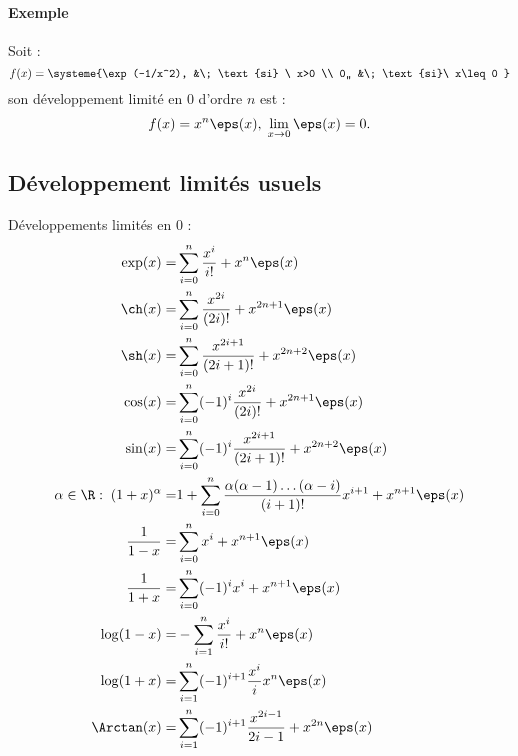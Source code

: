 \documentclass{mybourbaki}
\begin{document}
\paragraph{Exemple}Soit : \[ f(x) = \systeme{\exp(-1/x^2), &\; \text{si} \ x>0 \\ 0,, &\; \text{si}\ x\leq 0 }\]son développement limité en $0$ d'ordre $n$ est : \[ f(x) =x^{n}\eps(x),\; \lim_{x\to 0}\eps(x) = 0.\]

\subsection{Développement limités usuels}
Développements limités en $0$ :
\begin{align*}
\exp(x) = &\sum_{i=0}^{n}\frac{x^{i}}{i!} + x^{n}\eps(x) \\
\ch(x) = &\sum_{i=0}^{n}\frac{x^{2i}}{(2i)!}+ x^{2n+1}\eps(x) \\
\sh(x) = &\sum_{i=0}^{n}\frac{x^{2i+1}}{(2i+1)!} + x^{2n+2}\eps(x) \\
\cos(x) =& \sum_{i=0}^{n}(-1)^{i}\frac{x^{2i}}{(2i)!} + x^{2n+1}\eps(x) \\
\sin(x) =& \sum_{i=0}^{n}(-1)^{i} \frac{x^{2i+1}}{(2i+1)!} + x^{2n+2}\eps(x) \\
\alpha\in \R : \;(1+x)^{\alpha} =& 1 +\sum_{i=0}^{n}\frac{\alpha(\alpha-1)\ldots(\alpha-i)}{(i+1)!}x^{i+1} + x^{n+1}\eps(x) \\
\frac{1}{1-x} =& \sum_{i=0}^{n}x^{i} + x^{n+1}\eps(x) \\
\frac{1}{1+x} =& \sum_{i=0}^{n}(-1)^{i}x^{i} + x^{n+1}\eps(x) \\
\log(1-x) =& -\sum_{i=1}^{n}\frac{x^{i}}{i!}+x^{n}\eps(x) \\
\log(1+x) =& \sum_{i=1}^{n}(-1)^{i+1}\frac{x^{i}}{i}x^{n}\eps(x)\\
\Arctan(x) =& \sum_{i=1}^{n}(-1)^{i+1}\frac{x^{2i-1}}{2i-1} +x^{2n}\eps(x)
\end{align*}


\end{document}
